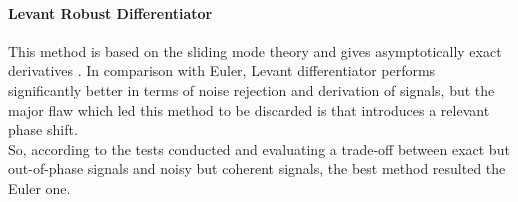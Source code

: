 \paragraph{Levant Robust Differentiator}
This method is based on the sliding mode theory and gives asymptotically exact derivatives \cite{levant06}. In comparison with Euler, Levant differentiator performs significantly better in terms of noise rejection and derivation of signals, but the major flaw which led this method to be discarded is that introduces a relevant phase shift.\\[1em]
So, according to the tests conducted and evaluating a trade-off between exact but out-of-phase signals and noisy but coherent signals, the best method resulted the Euler one.
\newpage